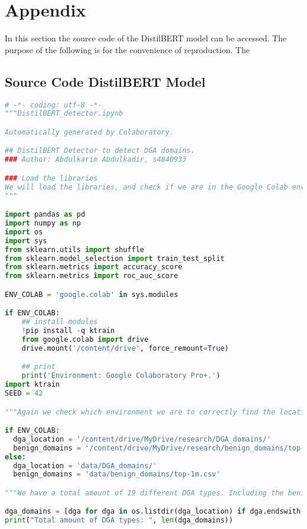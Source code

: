 \chapter{Appendix}\label{appendix}
In this section the source code of the DistilBERT model can be accessed. The purpose of the following is for the convenience of reproduction. The

\section{Source Code DistilBERT Model}
\begin{lstlisting}[language=Python]
    # -*- coding: utf-8 -*-
"""DistilBERT_detector.ipynb

Automatically generated by Colaboratory.

## DistilBERT Detector to detect DGA domains.
### Author: Abdulkarim Abdulkadir, s4840933

### Load the libraries
We will load the libraries, and check if we are in the Google Colab environment to pip install ktrain and import the drive mount library. This is to make sure that if the notebook is run locally, it will not execute Google Colab environment commands.
"""

import pandas as pd
import numpy as np
import os
import sys
from sklearn.utils import shuffle
from sklearn.model_selection import train_test_split
from sklearn.metrics import accuracy_score
from sklearn.metrics import roc_auc_score

ENV_COLAB = 'google.colab' in sys.modules

if ENV_COLAB:
    ## install modules
    !pip install -q ktrain
    from google.colab import drive
    drive.mount('/content/drive', force_remount=True) 

    ## print
    print('Environment: Google Colaboratory Pro+.')
import ktrain
SEED = 42

"""Again we check which environment we are to correctly find the location of the data of our domains"""

if ENV_COLAB:
  dga_location = '/content/drive/MyDrive/research/DGA_domains/'
  benign_domains = '/content/drive/MyDrive/research/benign_domains/top-1m.csv'
else:
  dga_location = 'data/DGA_domains/'
  benign_domains = 'data/benign_domains/top-1m.csv'

"""We have a total amount of 19 different DGA types. Including the benign domain data, this will total 20 different types."""

dga_domains = [dga for dga in os.listdir(dga_location) if dga.endswith(r".csv")]
print("Total amount of DGA types: ", len(dga_domains))


\end{lstlisting}
